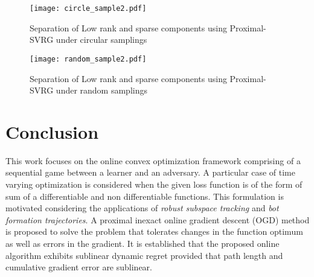 \documentclass[draftcls,onecolumn,12pt]{IEEEtran}
\theoremstyle{plain}
\def\D{\mathcal{D}}
\def \Ob {\boldsymbol{\Omega}}
\theoremstyle{plain}
\theoremstyle{remark}
\begin{document}
%

\begin{figure}
	\centering
	\texttt{[image: circle\_sample2.pdf]}
	\caption{Separation of Low rank and sparse components using Proximal-SVRG under circular samplings}\label{circle_sampl}
\end{figure}

\begin{figure}
	\centering
	\texttt{[image: random\_sample2.pdf]}
	\caption{Separation of Low rank and sparse components using Proximal-SVRG under random samplings}\label{random_sampl}
\end{figure}



\section{Conclusion}  		 
This work focuses on the online convex optimization framework comprising of a sequential game between a learner and an adversary. A particular case of time varying optimization is considered when the given loss function is of the form of sum of a differentiable and non differentiable functions. This formulation is motivated considering the applications of \emph{robust subspace tracking} and \emph{bot formation trajectories}. A proximal inexact online gradient descent (OGD) method is proposed to solve the problem that tolerates changes in the function optimum as well as errors in the gradient. It is established that the proposed online algorithm exhibits sublinear dynamic regret provided that path length and cumulative gradient error are sublinear. 
\end{document}
